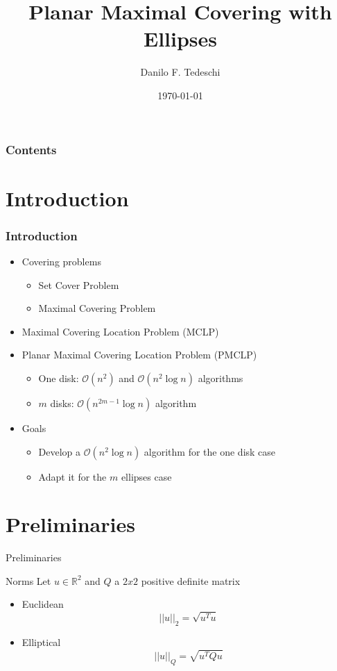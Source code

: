 \documentclass{beamer}
\title[Qualificação de Mestrado]{Planar Maximal Covering with Ellipses}
\author[Tedeschi, D. F.]{Danilo F. Tedeschi}
\institute[ICMC]{Instituto de Ciências Matemáticas e Computação}
\date{\today}
\newcommand{\R}{\mathbb{R}}
\newcommand{\bigO}{\mathscr{O}}
\begin{document}
\begin{frame}
 \maketitle
\end{frame}

\begin{frame}
\frametitle{Contents}
 \tableofcontents
\end{frame}

\section{Introduction}
\begin{frame}
\frametitle{Introduction}
\begin{itemize}
	\item Covering problems
	\begin{itemize}
		\item Set Cover Problem
		\item Maximal Covering Problem
	\end{itemize}
	\item Maximal Covering Location Problem (MCLP)
	\item Planar Maximal Covering Location Problem (PMCLP)
	\begin{itemize}
	\item One disk: $\bigO(n^2)$ and $\bigO(n^2\log{n})$ algorithms
	\item $m$ disks: $\bigO(n^{2m-1}\log{n})$ algorithm
	\end{itemize}
	\item Goals
	\begin{itemize}
		\item Develop a $\bigO(n^2\log{n})$ algorithm for the one disk case
		\item Adapt it for the $m$ ellipses case
	\end{itemize}
\end{itemize}

\end{frame} 


\section{Preliminaries}

\begin{frame}{Preliminaries}
	
	\begin{block}{Norms}
		Let $u \in \R^2$ and $Q$ a $2x2$ positive definite matrix
		\begin{itemize}
			\item Euclidean
			\begin{equation*}
			||u||_2 = \sqrt{u^Tu}
			\end{equation*}
			
			\item Elliptical
			\begin{equation*}
			||u||_{Q} = \sqrt{u^TQu}
			\end{equation*}
		\end{itemize}
	\end{block}

\end{frame}
\end{document}
